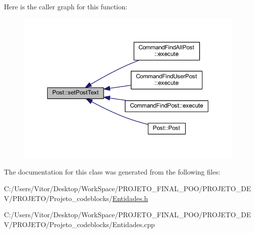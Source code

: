 Here is the caller graph for this function\-:\nopagebreak
\begin{figure}[H]
\begin{center}
\leavevmode
\includegraphics[width=350pt]{class_post_a707c32c73737cf886f32f733af58f851_icgraph}
\end{center}
\end{figure}




The documentation for this class was generated from the following files\-:\begin{DoxyCompactItemize}
\item 
C\-:/\-Users/\-Vitor/\-Desktop/\-Work\-Space/\-P\-R\-O\-J\-E\-T\-O\-\_\-\-F\-I\-N\-A\-L\-\_\-\-P\-O\-O/\-P\-R\-O\-J\-E\-T\-O\-\_\-\-D\-E\-V/\-P\-R\-O\-J\-E\-T\-O/\-Projeto\-\_\-codeblocks/\hyperlink{_entidades_8h}{Entidades.\-h}\item 
C\-:/\-Users/\-Vitor/\-Desktop/\-Work\-Space/\-P\-R\-O\-J\-E\-T\-O\-\_\-\-F\-I\-N\-A\-L\-\_\-\-P\-O\-O/\-P\-R\-O\-J\-E\-T\-O\-\_\-\-D\-E\-V/\-P\-R\-O\-J\-E\-T\-O/\-Projeto\-\_\-codeblocks/Entidades.\-cpp\end{DoxyCompactItemize}
